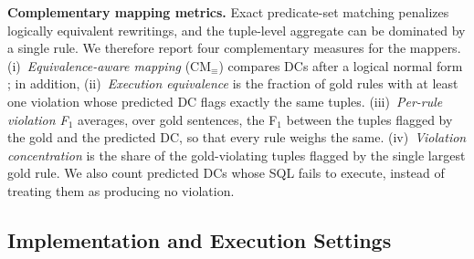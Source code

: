 \smallskip\noindent\textbf{Complementary mapping metrics.}
Exact predicate-set matching penalizes logically equivalent rewritings, and the
tuple-level aggregate can be dominated by a single rule. We therefore report
four complementary measures for the mappers. (i)~\emph{Equivalence-aware mapping} (CM$_{\equiv}$) compares DCs after a logical normal form ; in addition,
 (ii)~\emph{Execution equivalence} is the fraction of gold rules with at
least one violation whose predicted DC flags exactly the same tuples.
(iii)~\emph{Per-rule violation F$_1$} averages, over gold sentences, the F$_1$
between the tuples flagged by the gold and the predicted DC, so that every rule
weighs the same. (iv)~\emph{Violation concentration} is the share of the
gold-violating tuples flagged by the single largest gold rule. We also count predicted DCs whose SQL fails
to execute, instead of treating them as producing no violation.


\subsection{Implementation and Execution Settings}
\label{sec:implementation}

